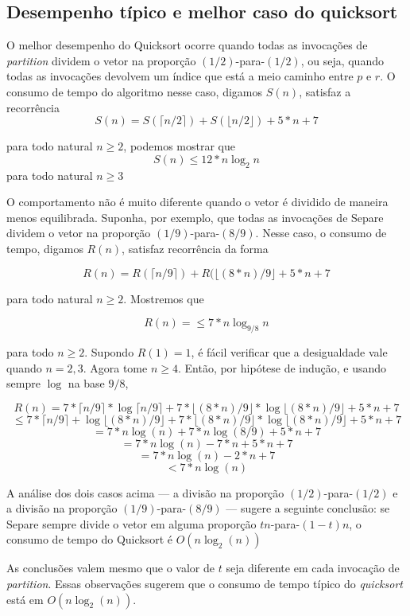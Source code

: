 \documentclass[12pt,a4paper,twoside]{report}
\begin{document}
\subsection{Desempenho típico e melhor caso do quicksort}

O melhor desempenho do Quicksort ocorre quando todas as invocações de {\it partition} dividem o vetor na proporção $(1/2)$-para-$(1/2)$, ou seja, quando todas as invocações devolvem um índice que está a meio caminho entre $p$ e $r$.  O consumo de tempo do algoritmo nesse caso, digamos $S(n)$, satisfaz a recorrência
\[S(n) = S(\lceil{}n/2\rceil{})+S(\lfloor{}n/2\rfloor{}) + 5*n + 7\] 

para todo natural $n \geq 2$, podemos mostrar que
\[S(n) \leq 12*n\log_{2}n\]
para todo natural $n \geq 3$

O comportamento não é muito diferente quando o vetor é dividido de maneira menos equilibrada.  Suponha, por exemplo, que todas as invocações de Separe dividem o vetor na proporção $(1/9)$-para-$(8/9)$.  Nesse caso, o consumo de tempo, digamos $R(n)$, satisfaz recorrência da forma

\[R(n) = R(\lceil{}n/9\rceil{})+R(\lfloor{}(8*n)/9\rfloor{} +5*n + 7\]

para todo natural $n \geq 2$. Mostremos que 

\[R(n) = \leq 7*n\log_{9/8}n\] 

para todo $n \geq 2$.  Supondo $R(1) = 1$, é fácil verificar que a desigualdade vale quando $n = 2, 3$.  Agora tome $n \geq 4$. Então, por hipótese de indução, e usando sempre $\log$ na base $9/8$,

\[R(n) = 7*\lceil{}n/9\rceil{}*\log\lceil{}n/9\rceil{}+7*\lfloor{}(8*n)/9\rfloor{}*\log\lfloor{}(8*n)/9\rfloor{} +5*n + 7\]
\[ \leq 7*\lceil{}n/9\rceil{} + \log\lfloor{}(8*n)/9\rfloor{}+7*\lfloor{}(8*n)/9\rfloor{}*\log\lfloor{}(8*n)/9\rfloor{} +5*n + 7\]
\[ = 7*n\log(n) + 7*n\log(8/9) + 5*n+7\]
\[ = 7*n\log(n) - 7*n + 5*n+7\]
\[ = 7*n\log(n) -2*n +7\]
\[ < 7*n \log(n)\]


A análise dos dois casos acima — a divisão na proporção $(1/2)$-para-$(1/2)$ e a divisão na proporção $(1/9)$-para-$(8/9)$ — sugere a seguinte conclusão:  se Separe sempre divide o vetor em alguma proporção $tn$-para-$(1−t)n$, o consumo de tempo do Quicksort é $O(n\log_{2}(n))$ 


As conclusões valem mesmo que o valor de $t$ seja diferente em cada invocação de {\it partition}.  Essas observações sugerem que o consumo de tempo típico do {\it quicksort} está em $O(n\log_{2}(n))$.
\end{document}
